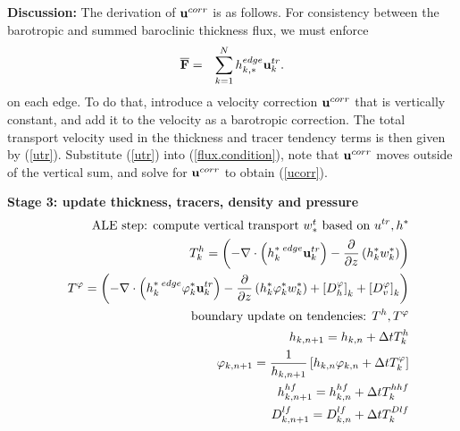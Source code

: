 \documentclass[11pt]{report}
\newcommand{\bea}{\begin{eqnarray}}
\newcommand{\eea}{\end{eqnarray}}
\begin{document}
{\bf Discussion:} The derivation of ${\bf u}^{corr}$ is as follows.  For consistency between the barotropic and summed baroclinic thickness flux,  we must enforce
\begin{eqnarray}
{\overline {\bf F}} &=& \sum_{k=1}^N h_{k,*}^{edge} {\bf u}_k^{tr}. \label{flux.condition}
\label{BclBtrFluxConsistency}
\end{eqnarray}
on each edge.  To do that, introduce a velocity correction ${\bf u}^{corr}$ that is vertically constant, and add it to the velocity as a barotropic correction.  The total transport velocity used in the thickness and tracer tendency terms is then given by (\ref{utr}).  Substitute (\ref{utr}) into (\ref{flux.condition}), note that ${\bf u}^{corr}$ moves outside of the vertical sum, and solve for ${\bf u}^{corr}$ to obtain (\ref{ucorr}).

\newpage
{\bf Stage 3: update thickness, tracers, density and pressure}
\bea &&
\mbox{ALE step: compute vertical transport $w^t_*$ based on } u^{tr}, h^* \\ &&
T^h_k = \left(  - \nabla \cdot \left( h_k^{*\; edge} {\bf u}_k^{tr} \right)  
- \frac{\partial}{\partial z} \left( h_k^* w_k^* \right)  \right)
\\ && 
T^\varphi %
= \left(  - \nabla \cdot \left( h_k^{*\; edge}\varphi_k^* {\bf u}_k^{tr} \right)  
- \frac{\partial}{\partial z} \left( h_k^*\varphi_k^* w_k^* \right)  
+ \left[D^\varphi_h\right]_k +  \left[D^\varphi_v\right]_k
\right) 
\\ &&
\mbox{boundary update on tendencies: } T^h,T^\varphi\\&& 
h_{k,n+1} = h_{k,n} +  \Delta t T^h_k \\&& 
\label{phi3}
{\varphi}_{k,n+1} = \frac{1}{h_{k,n+1}} \left[
h_{k,n} \varphi_{k,n} 
+ \Delta t T^\varphi_k \right]
\label{phi}
\\&&
h^{hf}_{k,n+1} = h^{hf}_{k,n} + \Delta t T^{hhf}_k \\ &&
D^{lf}_{k,n+1} = D^{lf}_{k,n} + \Delta t T^{Dlf}_k 
\eea
\end{document}
